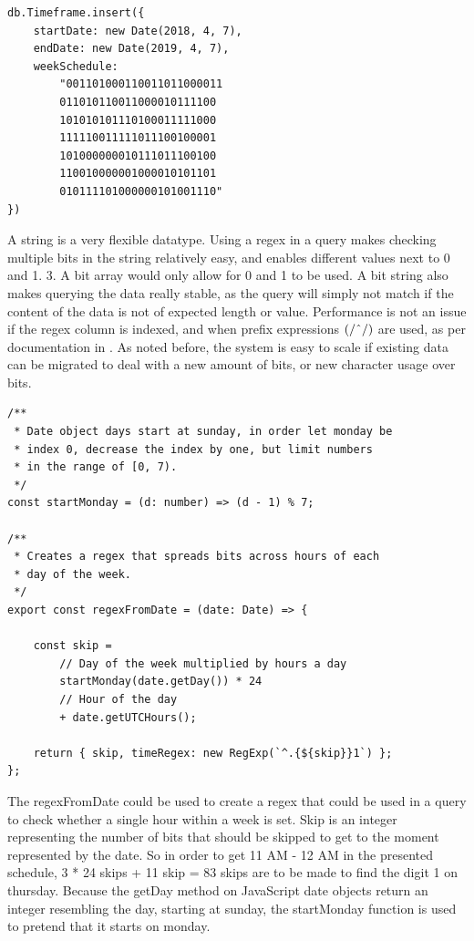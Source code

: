 \begin{center}
	\noindent\begin{minipage}{.45\textwidth}
		\begin{lstlisting}[caption={Improved timeframe.}, label={lst:new-timeframe}]
db.Timeframe.insert({
	startDate: new Date(2018, 4, 7),
	endDate: new Date(2019, 4, 7),
	weekSchedule:
		"001101000110011011000011
		011010110011000010111100
		101010101110100011111000
		111110011111011100100001
		101000000010111011100100
		110010000001000010101101
		010111101000000101001110"
})
\end{lstlisting}
	\end{minipage}
\end{center}

A string is a very flexible datatype. Using a regex in a query makes checking multiple bits in the string relatively easy, and enables different values next to 0 and 1. 3. A bit array would only allow for 0 and 1 to be used. A bit string also makes querying the data really stable, as the query will simply not match if the content of the data is not of expected length or value. Performance is not an issue if the regex column is indexed, and when prefix expressions $(/\string^/)$ are used, as per documentation in \cite{MongoDB-Regex}. As noted before, the system is easy to scale if existing data can be migrated to deal with a new amount of bits, or new character usage over bits.

\begin{lstlisting}[caption={Opening timeframe.}, label={lst:open-timeframe}]
/**
 * Date object days start at sunday, in order let monday be
 * index 0, decrease the index by one, but limit numbers
 * in the range of [0, 7).
 */
const startMonday = (d: number) => (d - 1) % 7;

/**
 * Creates a regex that spreads bits across hours of each
 * day of the week.
 */
export const regexFromDate = (date: Date) => {

	const skip =
		// Day of the week multiplied by hours a day
		startMonday(date.getDay()) * 24
		// Hour of the day
		+ date.getUTCHours();

	return { skip, timeRegex: new RegExp(`^.{${skip}}1`) };
};
\end{lstlisting}

The regexFromDate could be used to create a regex that could be used in a query to check whether a single hour within a week is set. Skip is an integer representing the number of bits that should be skipped to get to the moment represented by the date. So in order to get 11 AM - 12 AM in the presented schedule, 3 * 24 skips + 11 skip = 83 skips are to be made to find the digit 1 on thursday. Because the getDay method on JavaScript date objects return an integer resembling the day, starting at sunday, the startMonday function is used to pretend that it starts on monday.

